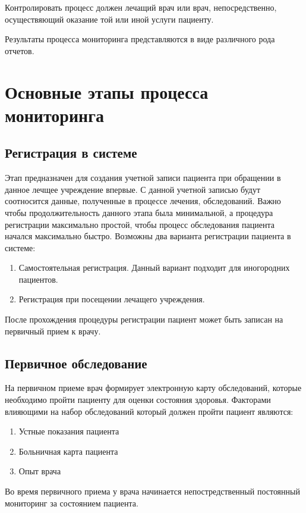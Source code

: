 Контролировать процесс должен лечащий врач или врач, непосредственно, осуществяющий оказание той или иной услуги пациенту.

Результаты процесса мониторинга представляются в виде различного рода отчетов.

\section{Основные этапы процесса мониторинга}

\subsection{Регистрация в системе}

Этап предназначен для создания учетной записи пациента при обращении в данное
лечщее учреждение впервые. С данной учетной записью будут соотносится данные,
полученные в процессе лечения, обследований. Важно чтобы продолжительность
данного этапа была минимальной, а процедура регистрации максимально простой,
чтобы процесс обследования пациента начался максимально быстро.
Возможны два варианта регистрации пациента в системе:

\begin{enumerate}
  \item Самостоятельная регистрация. Данный вариант подходит для иногородних
  пациентов.
  \item Регистрация при посещении лечащего учреждения.
\end{enumerate}

После прохождения процедуры регистрации пациент может быть записан на первичный
прием к врачу.

\subsection{Первичное обследование}

На первичном приеме врач формирует электронную карту обследований, которые
необходимо пройти пациенту для оценки состояния здоровья. Факторами влияющими на
набор обследований который должен пройти пациент являются:
\begin{enumerate}
  \item Устные показания пациента
  \item Больничная карта пациента
  \item Опыт врача   
\end{enumerate}

Во время первичного приема у врача начинается непостредственный постоянный
мониторинг за состоянием пациента.


